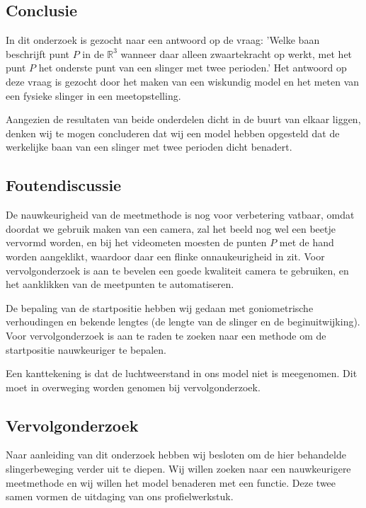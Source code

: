 \documentclass[a4paper]{article}
\begin{document}
	\subsection{Conclusie}
	In dit onderzoek is gezocht naar een antwoord op de vraag: 'Welke baan beschrijft punt $P$ in de $\mathbb{R}^{3}$ wanneer daar alleen zwaartekracht op werkt, met het punt $P$ het onderste punt van een slinger met twee perioden.' Het antwoord op deze vraag is gezocht door het maken van een wiskundig model en het meten van een fysieke slinger in een meetopstelling. 
	
	Aangezien de resultaten van beide onderdelen dicht in de buurt van elkaar liggen, denken wij te mogen concluderen dat wij een model hebben opgesteld dat de werkelijke baan van een slinger met twee perioden dicht benadert.
	
	\subsection{Foutendiscussie}
	De nauwkeurigheid van de meetmethode is nog voor verbetering vatbaar, omdat doordat we gebruik maken van een camera, zal het beeld nog wel een beetje vervormd worden, en bij het videometen moesten de punten $P$ met de hand worden aangeklikt, waardoor daar een flinke onnaukeurigheid in zit.  Voor vervolgonderzoek is aan te bevelen een goede kwaliteit camera te gebruiken, en het aanklikken van de meetpunten te automatiseren.
	
	De bepaling van de startpositie hebben wij gedaan met goniometrische verhoudingen en bekende lengtes (de lengte van de slinger en de beginuitwijking). Voor vervolgonderzoek is aan te raden te zoeken naar een methode om de startpositie nauwkeuriger te bepalen.
	
	Een kanttekening is dat de luchtweerstand in ons model niet is meegenomen. Dit moet in overweging worden genomen bij vervolgonderzoek.
	
	\subsection{Vervolgonderzoek}
	Naar aanleiding van dit onderzoek hebben wij besloten om de hier behandelde slingerbeweging verder uit te diepen. Wij willen zoeken naar een nauwkeurigere meetmethode en wij willen het model benaderen met een functie. Deze twee samen vormen de uitdaging van ons profielwerkstuk.
	
	\appendix
	\clearpage
	
\end{document}
